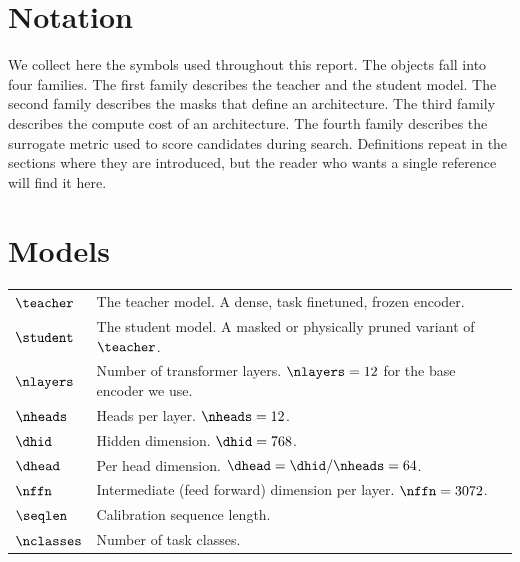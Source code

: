 \section*{Notation}

We collect here the symbols used throughout this report. The objects fall into four families. The first family describes the teacher and the student model. The second family describes the masks that define an architecture. The third family describes the compute cost of an architecture. The fourth family describes the surrogate metric used to score candidates during search. Definitions repeat in the sections where they are introduced, but the reader who wants a single reference will find it here.

\section*{Models}
\begin{tabular}{ll}
$\teacher$ & The teacher model. A dense, task finetuned, frozen encoder. \\
$\student$ & The student model. A masked or physically pruned variant of $\teacher$. \\
$\nlayers$ & Number of transformer layers. $\nlayers = 12$ for the base encoder we use. \\
$\nheads$ & Heads per layer. $\nheads = 12$. \\
$\dhid$ & Hidden dimension. $\dhid = 768$. \\
$\dhead$ & Per head dimension. $\dhead = \dhid / \nheads = 64$. \\
$\nffn$ & Intermediate (feed forward) dimension per layer. $\nffn = 3072$. \\
$\seqlen$ & Calibration sequence length. \\
$\nclasses$ & Number of task classes. \\
\end{tabular}

